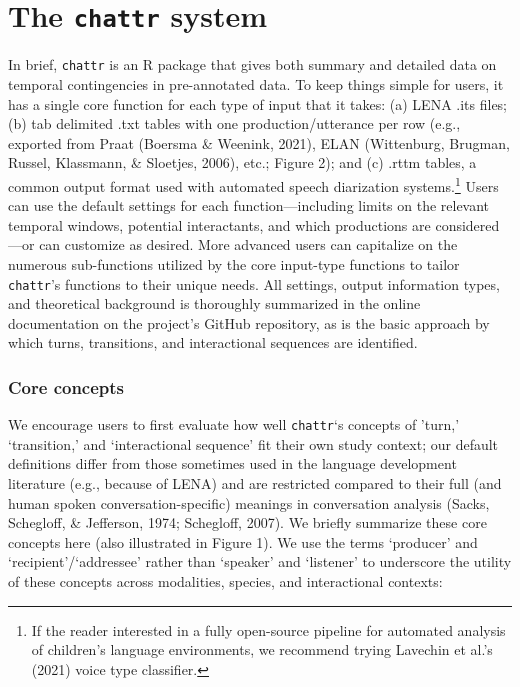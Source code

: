 \documentclass[10pt, letterpaper]{article}
\begin{document}
\hypertarget{the-chattr-system}{%
\section{\texorpdfstring{The \texttt{chattr}
system}{The chattr system}}\label{the-chattr-system}}

In brief, \texttt{chattr} is an R package that gives both summary and
detailed data on temporal contingencies in pre-annotated data. To keep
things simple for users, it has a single core function for each type of
input that it takes: (a) LENA .its files; (b) tab delimited .txt tables
with one production/utterance per row (e.g., exported from Praat
(Boersma \& Weenink, 2021), ELAN (Wittenburg, Brugman, Russel,
Klassmann, \& Sloetjes, 2006), etc.; Figure 2); and (c) .rttm tables, a
common output format used with automated speech diarization
systems.\footnote{If the reader interested in a fully open-source
  pipeline for automated analysis of children's language environments,
  we recommend trying Lavechin et al.'s (2021) voice type classifier.}
Users can use the default settings for each function---including limits
on the relevant temporal windows, potential interactants, and which
productions are considered---or can customize as desired. More advanced
users can capitalize on the numerous sub-functions utilized by the core
input-type functions to tailor \texttt{chattr}'s functions to their
unique needs. All settings, output information types, and theoretical
background is thoroughly summarized in the online documentation on the
project's GitHub repository, as is the basic approach by which turns,
transitions, and interactional sequences are identified.

\hypertarget{core-concepts}{%
\subsubsection{Core concepts}\label{core-concepts}}

We encourage users to first evaluate how well \texttt{chattr}`s concepts
of 'turn,' `transition,' and `interactional sequence' fit their own
study context; our default definitions differ from those sometimes used
in the language development literature (e.g., because of LENA) and are
restricted compared to their full (and human spoken
conversation-specific) meanings in conversation analysis (Sacks,
Schegloff, \& Jefferson, 1974; Schegloff, 2007). We briefly summarize
these core concepts here (also illustrated in Figure 1). We use the
terms `producer' and `recipient'/`addressee' rather than `speaker' and
`listener' to underscore the utility of these concepts across
modalities, species, and interactional contexts:
\end{document}
